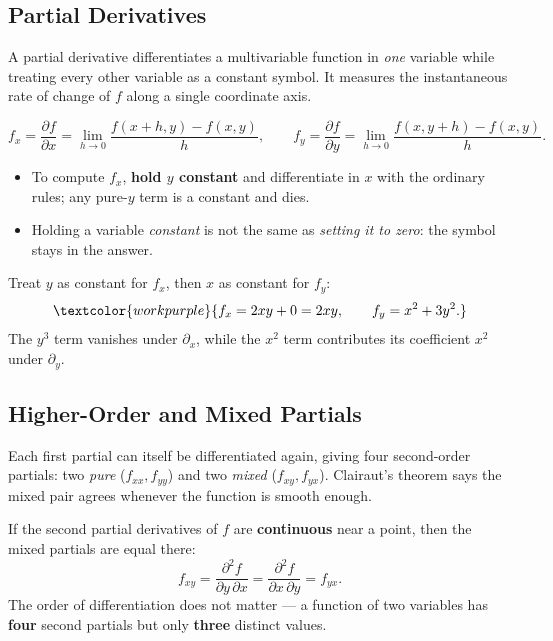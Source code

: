 \subsection{Partial Derivatives}

A partial derivative differentiates a multivariable function in \emph{one}
variable while treating every other variable as a constant symbol. It measures
the instantaneous rate of change of $f$ along a single coordinate axis.

\begin{formulabox}
\[ f_x = \frac{\partial f}{\partial x} = \lim_{h\to 0}\frac{f(x+h,y)-f(x,y)}{h},
   \qquad
   f_y = \frac{\partial f}{\partial y} = \lim_{h\to 0}\frac{f(x,y+h)-f(x,y)}{h}. \]
\begin{itemize}[leftmargin=1.4em, itemsep=2pt]
    \item To compute $f_x$, \textbf{hold $y$ constant} and differentiate in $x$
          with the ordinary rules; any pure-$y$ term is a constant and dies.
    \item Holding a variable \emph{constant} is not the same as
          \emph{setting it to zero}: the symbol stays in the answer.
\end{itemize}
\end{formulabox}

\begin{examplebox}[Worked Example 6.1: First partials of $f=x^2y+y^3$]
Treat $y$ as constant for $f_x$, then $x$ as constant for $f_y$:
\[ \textcolor{workpurple}{f_x = 2xy + 0 = 2xy, \qquad f_y = x^2 + 3y^2.} \]
The $y^3$ term vanishes under $\partial_x$, while the $x^2$ term contributes its
coefficient $x^2$ under $\partial_y$.
\end{examplebox}

\subsection{Higher-Order and Mixed Partials}

Each first partial can itself be differentiated again, giving four second-order
partials: two \emph{pure} ($f_{xx},f_{yy}$) and two \emph{mixed}
($f_{xy},f_{yx}$). Clairaut's theorem says the mixed pair agrees whenever the
function is smooth enough.

\begin{formulabox}
If the second partial derivatives of $f$ are \textbf{continuous} near a point,
then the mixed partials are equal there:
\[ f_{xy} = \frac{\partial^2 f}{\partial y\,\partial x}
          = \frac{\partial^2 f}{\partial x\,\partial y} = f_{yx}. \]
The order of differentiation does not matter --- a function of two variables has
\textbf{four} second partials but only \textbf{three} distinct values.
\end{formulabox}

